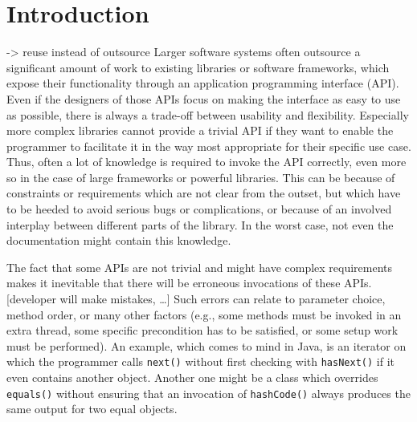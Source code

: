 \chapter{Introduction}\label{ch:intro}


-> reuse instead of outsource
Larger software systems often outsource a significant amount of work to existing libraries or software frameworks, which expose their functionality through an application programming interface (API).
Even if the designers of those APIs focus on making the interface as easy to use as possible, there is always a trade-off between usability and flexibility.
Especially more complex libraries cannot provide a trivial API if they want to enable the programmer to facilitate it in the way most appropriate for their specific use case.
Thus, often a lot of knowledge is required to invoke the API correctly, even more so in the case of large frameworks or powerful libraries.
This can be because of constraints or requirements which are not clear from the outset, but which have to be heeded to avoid serious bugs or complications, or because of an involved interplay between different parts of the library.
In the worst case, not even the documentation might contain this knowledge.

The fact that some APIs are not trivial and might have complex requirements makes it inevitable that there will be erroneous invocations of these APIs.
[developer will make mistakes, \ldots]
Such errors can relate to parameter choice, method order, or many other factors (e.g., some methods must be invoked in an extra thread, some specific precondition has to be satisfied, or some setup work must be performed).
An example, which comes to mind in Java, is an iterator on which the programmer calls \texttt{next()} without first checking with \texttt{hasNext()} if it even contains another object.
Another one might be a class which overrides \texttt{equals()} without ensuring that an invocation of \texttt{hashCode()} always produces the same output for two equal objects.

